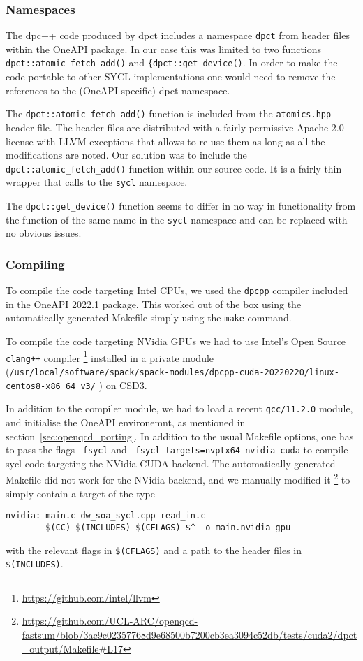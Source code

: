 \subsubsection{Namespaces}

The dpc++ code produced by dpct includes a namespace \texttt{dpct} from header files within the OneAPI package. In our case this was limited to two functions \verb!dpct::atomic_fetch_add()! and \verb!{dpct::get_device()!. In order to make the code portable to other SYCL implementations one would need to remove the references to the (OneAPI specific) dpct namespace.

The \verb!dpct::atomic_fetch_add()! function is included from the \texttt{atomics.hpp} header file. The header files are distributed with a fairly permissive Apache-2.0 license with LLVM exceptions that allows to re-use them as long as all the modifications are noted. Our solution was to include the \verb!dpct::atomic_fetch_add()! function within our source code. It is a fairly thin wrapper that calls to the \texttt{sycl} namespace.

The \verb!dpct::get_device()! function seems to differ in no way in functionality from the function of the same name in the \texttt{sycl} namespace and can be replaced with no obvious issues. 

\subsubsection{Compiling}

To compile the code targeting Intel CPUs, we used the \texttt{dpcpp} compiler included in the OneAPI 2022.1 package. This worked out of the box using the automatically generated Makefile simply using the \texttt{make} command.

To compile the code targeting NVidia GPUs we had to use Intel's Open Source \verb #clang++# compiler \footnote{\url{https://github.com/intel/llvm}}
installed in a private module (\verb #/usr/local/software/spack/spack-modules/dpcpp-cuda-20220220/linux-centos8-x86_64_v3/# ) on CSD3.

In addition to the compiler module, we had to load a recent \verb #gcc/11.2.0# module, and initialise the OneAPI environemnt, as mentioned in section~\ref{sec:openqcd_porting}. In addition to the usual Makefile options, one has to pass the flags \verb #-fsycl# and \verb #-fsycl-targets=nvptx64-nvidia-cuda# to compile sycl code targeting the NVidia CUDA backend. The automatically generated Makefile did not work for the NVidia backend, and we manually modified it \footnote{\url{https://github.com/UCL-ARC/openqcd-fastsum/blob/3ac9c02357768d9e68500b7200cb3ea3094c52db/tests/cuda2/dpct_output/Makefile\#L17}} to simply contain a target of the type
\begin{verbatim}
nvidia: main.c dw_soa_sycl.cpp read_in.c
        $(CC) $(INCLUDES) $(CFLAGS) $^ -o main.nvidia_gpu
\end{verbatim}
with the relevant flags in \verb #$(CFLAGS)# and a path to the header files in \verb #$(INCLUDES)#.


